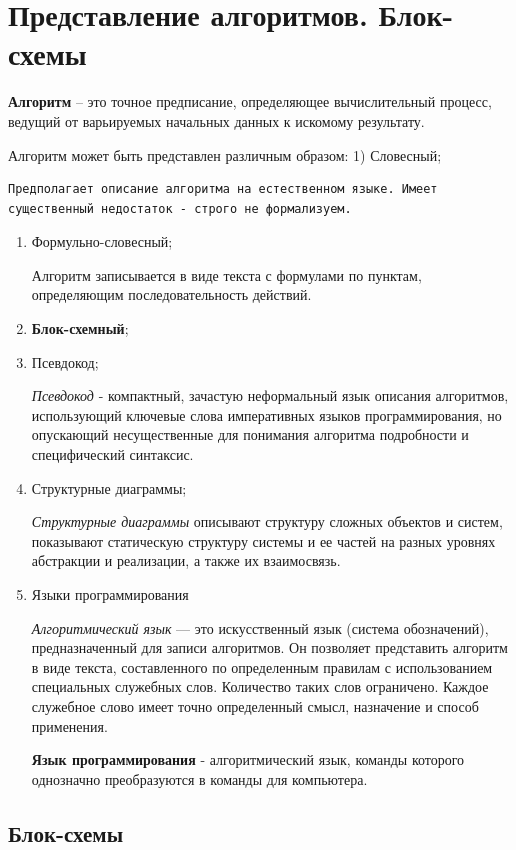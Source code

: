 \section{Представление алгоритмов. Блок-схемы}

\textbf{Алгоритм} -- это точное предписание, определяющее вычислительный
процесс, ведущий от варьируемых начальных данных к искомому результату.

Алгоритм может быть представлен различным образом: 1) Словесный;

\begin{verbatim}
Предполагает описание алгоритма на естественном языке. Имеет существенный недостаток - строго не формализуем.
\end{verbatim}

\begin{enumerate}
\item
  Формульно-словесный;

  Алгоритм записывается в виде текста с формулами по пунктам,
  определяющим последовательность действий.
\item
  \textbf{Блок-схемный};
\item
  Псевдокод;

  \emph{Псевдокод} - компактный, зачастую неформальный язык описания
  алгоритмов, использующий ключевые слова императивных языков
  программирования, но опускающий несущественные для понимания алгоритма
  подробности и специфический синтаксис.
\item
  Структурные диаграммы;

  \emph{Структурные диаграммы} описывают структуру сложных объектов и
  систем, показывают статическую структуру системы и ее частей на разных
  уровнях абстракции и реализации, а также их взаимосвязь.
\item
  Языки программирования

  \emph{Алгоритмический язык} --- это искусственный язык (система
  обозначений), предназначенный для записи алгоритмов. Он позволяет
  представить алгоритм в виде текста, составленного по определенным
  правилам с использованием специальных служебных слов. Количество таких
  слов ограничено. Каждое служебное слово имеет точно определенный
  смысл, назначение и способ применения.

  \textbf{Язык программирования} - алгоритмический язык, команды
  которого однозначно преобразуются в команды для компьютера.
\end{enumerate}

\subsection{Блок-схемы}\label{ux431ux43bux43eux43a-ux441ux445ux435ux43cux44b}

